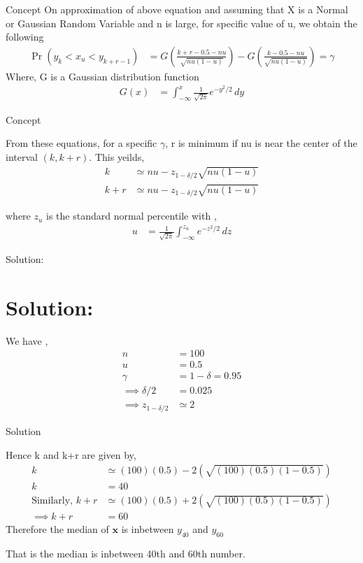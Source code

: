 \documentclass{beamer}
\providecommand{\pr}[1]{\ensuremath{\Pr\left(#1\right)}}
\theoremstyle{remark}
\numberwithin{equation}{subsection}
\let\vec\mathbf
\begin{document}
\begin{frame}{Concept}
    On approximation of above equation and assuming that X is a Normal or Gaussian Random Variable and n is large, for specific value of u,
    we obtain the following
    \begin{align}
        \pr{y_k < x_u < y_{k+r-1}} &= G(\frac{k + r - 0.5 - nu}{\sqrt{nu(1-u)}}) - G(\frac{k - 0.5 - nu}{\sqrt{nu(1-u)}}) = \gamma
     \end{align}
     Where, G is a Gaussian distribution function
     \begin{align}
         G(x) &= \int_{-\infty}^{x} \frac{1}{\sqrt{2\pi}} e^{-y^2/2} \, dy
     \end{align}
\end{frame}

\begin{frame}{Concept}

    From these equations, for a specific $\gamma$, r is minimum if nu is near the center of the interval $(k, k+r)$. This yeilds,
    \begin{align}
        k &\simeq nu-z_{1-\delta/2}\sqrt{nu(1-u)} \\
        k+r &\simeq nu-z_{1-\delta/2}\sqrt{nu(1-u)} 
    \end{align}
    
    where $z_u$ is the standard normal percentile with ,
\begin{align}
    u &= \frac{1}{\sqrt{2\pi}} \int_{-\infty}^{z_u} e^{-z^2/2} \, dz
\end{align}
\end{frame}

\begin{frame}{Solution:}

    \section{Solution:}
    We have ,
    \begin{align}
        n &= 100 \\
        u &= 0.5 \\
        \gamma &= 1-\delta = 0.95 \\
        \implies \delta/2 &= 0.025\\
        \implies z_{1-\delta/2} &\simeq 2
    \end{align}
\end{frame}

\begin{frame}{Solution}

    Hence k and k+r are given by,
    \begin{align}
        k &\simeq (100)(0.5) - 2(\sqrt{(100)(0.5)(1-0.5)}) \\
        k &= 40 \\
        \text{Similarly, } k+r &\simeq (100)(0.5) + 2(\sqrt{(100)(0.5)(1-0.5)}) \\
        \implies k+r &= 60
    \end{align}
    Therefore the median of $\vec{x}$ is inbetween $y_{40}$ and $y_{60}$\newline
    
    That is the median is inbetween 40th and 60th number.
\end{frame}
\end{document}

